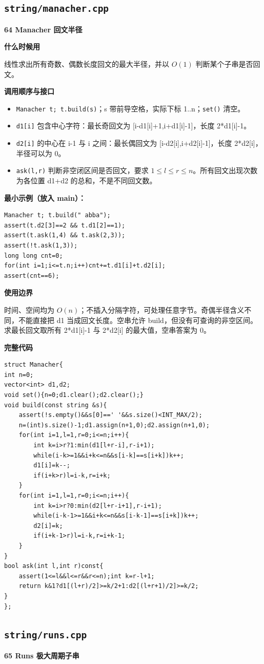 \documentclass[UTF8,a4paper,10pt]{ctexart}
\newcommand{\TemplUsage}[1]{\textbf{什么时候用}\par #1\par}
\newcommand{\TemplApi}[1]{\textbf{调用顺序与接口}\par #1\par}
\newcommand{\TemplNote}[1]{\textbf{使用边界}\par #1\par}
\begin{document}
\subsection{\texttt{string/manacher.cpp}}
\textbf{64 Manacher 回文半径}

\TemplUsage{线性求出所有奇数、偶数长度回文的最大半径，并以 $O(1)$ 判断某个子串是否回文。}
\TemplApi{\begin{itemize}
\item \texttt{Manacher t; t.build(s)}；s 带前导空格，实际下标 1..n；\texttt{set()} 清空。
\item \texttt{d1[i]} 包含中心字符：最长奇回文为 [i-d1[i]+1,i+d1[i]-1]，长度 2*d1[i]-1。
\item \texttt{d2[i]} 的中心在 i-1 与 i 之间：最长偶回文为 [i-d2[i],i+d2[i]-1]，长度 2*d2[i]，半径可以为 0。
\item \texttt{ask(l,r)} 判断非空闭区间是否回文，要求 $1\le l\le r\le n$。所有回文出现次数为各位置 d1+d2 的总和，不是不同回文数。
\end{itemize}}
\textbf{最小示例（放入 main）：}
\begin{lstlisting}
Manacher t; t.build(" abba");
assert(t.d2[3]==2 && t.d1[2]==1);
assert(t.ask(1,4) && t.ask(2,3));
assert(!t.ask(1,3));
long long cnt=0;
for(int i=1;i<=t.n;i++)cnt+=t.d1[i]+t.d2[i];
assert(cnt==6);
\end{lstlisting}
\TemplNote{时间、空间均为 $O(n)$；不插入分隔字符，可处理任意字节。奇偶半径含义不同，不能直接把 d1 当成回文长度。空串允许 build，但没有可查询的非空区间。求最长回文取所有 2*d1[i]-1 与 2*d2[i] 的最大值，空串答案为 0。}
\textbf{完整代码}
\begin{lstlisting}[firstnumber=1]
struct Manacher{
int n=0;
vector<int> d1,d2;
void set(){n=0;d1.clear();d2.clear();}
void build(const string &s){
	assert(!s.empty()&&s[0]==' '&&s.size()<INT_MAX/2);
	n=(int)s.size()-1;d1.assign(n+1,0);d2.assign(n+1,0);
	for(int i=1,l=1,r=0;i<=n;i++){
		int k=i>r?1:min(d1[l+r-i],r-i+1);
		while(i-k>=1&&i+k<=n&&s[i-k]==s[i+k])k++;
		d1[i]=k--;
		if(i+k>r)l=i-k,r=i+k;
	}
	for(int i=1,l=1,r=0;i<=n;i++){
		int k=i>r?0:min(d2[l+r-i+1],r-i+1);
		while(i-k-1>=1&&i+k<=n&&s[i-k-1]==s[i+k])k++;
		d2[i]=k;
		if(i+k-1>r)l=i-k,r=i+k-1;
	}
}
bool ask(int l,int r)const{
	assert(1<=l&&l<=r&&r<=n);int k=r-l+1;
	return k&1?d1[(l+r)/2]>=k/2+1:d2[(l+r+1)/2]>=k/2;
}
};
\end{lstlisting}
\par\vspace{1em}
\subsection{\texttt{string/runs.cpp}}
\textbf{65 Runs 极大周期子串}
\end{document}
